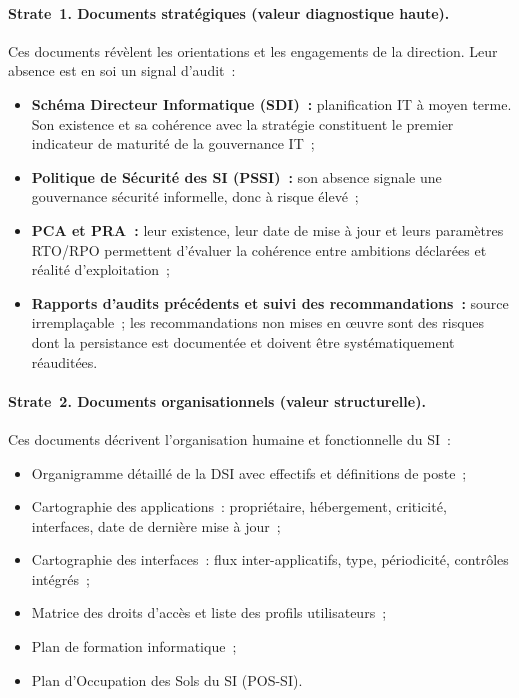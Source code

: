 \paragraph{Strate~1. Documents stratégiques (valeur diagnostique haute).}
Ces documents révèlent les orientations et les engagements de la direction.
Leur absence est en soi un signal d'audit~:
\begin{itemize}
    \item \textbf{Schéma Directeur Informatique (SDI)~:} planification IT à moyen terme.
        Son existence et sa cohérence avec la stratégie constituent le premier indicateur
        de maturité de la gouvernance IT~;
    \item \textbf{Politique de Sécurité des SI (PSSI)~:} son absence signale une
        gouvernance sécurité informelle, donc à risque élevé~;
    \item \textbf{PCA et PRA~:} leur existence, leur date de mise à jour et leurs
        paramètres RTO/RPO permettent d'évaluer la cohérence entre ambitions déclarées
        et réalité d'exploitation~;
    \item \textbf{Rapports d'audits précédents et suivi des recommandations~:} source
        irremplaçable~; les recommandations non mises en œuvre sont des risques dont la
        persistance est documentée et doivent être systématiquement réauditées.
\end{itemize}

\paragraph{Strate~2. Documents organisationnels (valeur structurelle).}
Ces documents décrivent l'organisation humaine et fonctionnelle du SI~:
\begin{itemize}
    \item Organigramme détaillé de la DSI avec effectifs et définitions de poste~;
    \item Cartographie des applications~: propriétaire, hébergement, criticité, interfaces,
        date de dernière mise à jour~;
    \item Cartographie des interfaces~: flux inter-applicatifs, type, périodicité,
        contrôles intégrés~;
    \item Matrice des droits d'accès et liste des profils utilisateurs~;
    \item Plan de formation informatique~;
    \item Plan d'Occupation des Sols du SI (POS-SI).
\end{itemize}

